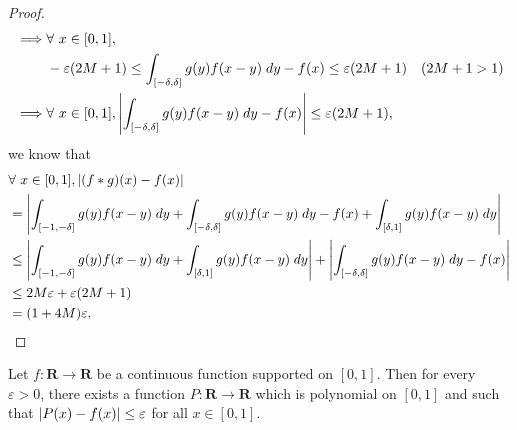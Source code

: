 \begin{proof}
\begin{align*}
        \implies & \forall\ x \in [0, 1],                                                                                                                                              \\
                 & -\varepsilon (2M + 1) \leq \int_{[-\delta, \delta]} g(y) f(x - y) \; dy - f(x) \leq \varepsilon (2M + 1)                      & (2M + 1 > 1)                        \\
        \implies & \forall\ x \in [0, 1], \abs*{\int_{[-\delta, \delta]} g(y) f(x - y) \; dy - f(x)} \leq \varepsilon (2M + 1),
    \end{align*}
    we know that
    \begin{align*}
         & \forall\ x \in [0, 1], \abs*{(f * g)(x) - f(x)}                                                                                                            \\
         & = \abs*{\int_{[-1, -\delta]} g(y) f(x - y) \; dy + \int_{[-\delta, \delta]} g(y) f(x - y) \; dy - f(x) + \int_{[\delta, 1]} g(y) f(x - y) \; dy}           \\
         & \leq \abs*{\int_{[-1, -\delta]} g(y) f(x - y) \; dy + \int_{[\delta, 1]} g(y) f(x - y) \; dy} + \abs*{\int_{[-\delta, \delta]} g(y) f(x - y) \; dy - f(x)} \\
         & \leq 2 M \varepsilon + \varepsilon (2M + 1)                                                                                                                \\
         & = (1 + 4M) \varepsilon.
    \end{align*}
\end{proof}

\begin{corollary}\label{3.8.15}
    Let \(f : \mathbf{R} \to \mathbf{R}\) be a continuous function supported on \([0, 1]\).
    Then for every \(\varepsilon > 0\), there exists a function \(P : \mathbf{R} \to \mathbf{R}\) which is polynomial on \([0, 1]\) and such that \(\abs*{P(x) - f(x)} \leq \varepsilon\) for all \(x \in [0, 1]\).
\end{corollary}


